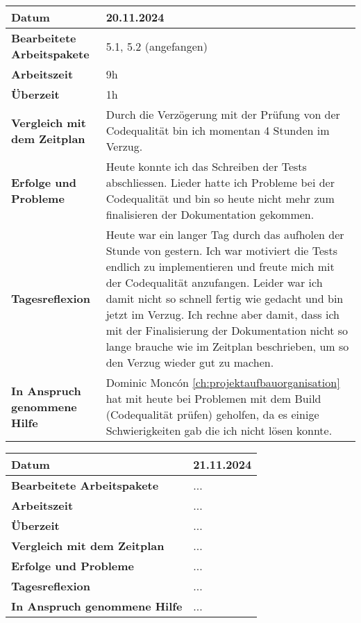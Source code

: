 \begin{longtable}{p{}|p{}}
	\hline
	\textbf{Datum}                       & 20.11.2024            \\
	\hline
	\textbf{Bearbeitete Arbeitspakete}   & 5.1, 5.2 (angefangen)                  \\
	\hline
	\textbf{Arbeitszeit}                 & 9h                                    \\
	\hline
	\textbf{Überzeit}                    & 1h                                    \\
	\hline
	\textbf{Vergleich mit dem Zeitplan}  & Durch die Verzögerung mit der Prüfung von der Codequalität bin ich momentan 4 Stunden im Verzug.\\
	\hline
	\textbf{Erfolge und Probleme} & Heute konnte ich das Schreiben der Tests abschliessen. Lieder hatte ich Probleme bei der Codequalität und bin so heute nicht mehr zum finalisieren der Dokumentation gekommen.
	\\
	\hline
	\textbf{Tagesreflexion} & Heute war ein langer Tag durch das aufholen der Stunde von gestern. Ich war motiviert die Tests endlich zu implementieren und freute mich mit der Codequalität anzufangen. Leider war ich damit nicht so schnell fertig wie gedacht und bin jetzt im Verzug. Ich rechne aber damit, dass ich mit der Finalisierung der Dokumentation nicht so lange brauche wie im Zeitplan beschrieben, um so den Verzug wieder gut zu machen.
	\\
	\hline
	\textbf{In Anspruch genommene Hilfe} & Dominic Moncón \ref{ch:projektaufbauorganisation} hat mit heute bei Problemen mit dem Build (Codequalität prüfen) geholfen, da es einige Schwierigkeiten gab die ich nicht lösen konnte.                            \\
	\hline
\end{longtable}\label{tab:arbeitsprotokoll-20.11.2024}
\newpage

\begin{longtable}{p{}|p{}}
	\hline
	\textbf{Datum}                       & 21.11.2024            \\
	\hline
	\textbf{Bearbeitete Arbeitspakete}   & ...                  \\
	\hline
	\textbf{Arbeitszeit}                 & ...                                    \\
	\hline
	\textbf{Überzeit}                    & ...                                    \\
	\hline
	\textbf{Vergleich mit dem Zeitplan}  & ... \\
	\hline
	\textbf{Erfolge und Probleme} & ...
	\\
	\hline
	\textbf{Tagesreflexion} & ...
	\\
	\hline
	\textbf{In Anspruch genommene Hilfe} & ...                              \\
	\hline
\end{longtable}\label{tab:arbeitsprotokoll-21.11.2024}
\newpage

